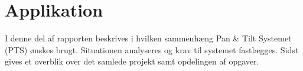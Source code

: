 \cleardoublepage
{}
\setcounter{page}{1}
\part{Applikation}
I denne del af rapporten beskrives i hvilken sammenhæng Pan \& Tilt Systemet (PTS) 
ønskes brugt. Situationen analyseres og krav til systemet fastlægges. Sidst 
gives et overblik over det samlede projekt samt opdelingen af opgaver.



